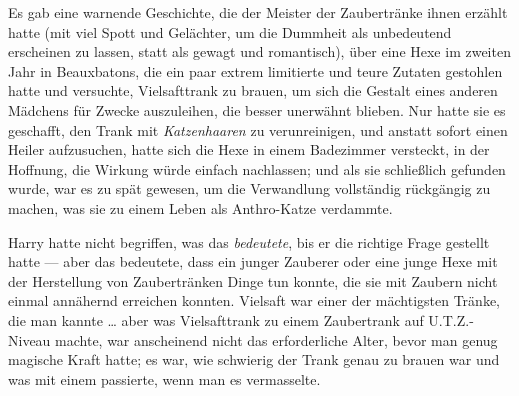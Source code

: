 Es gab eine warnende Geschichte, die der Meister der Zaubertränke ihnen erzählt hatte (mit viel Spott und Gelächter, um die Dummheit als unbedeutend erscheinen zu lassen, statt als gewagt und romantisch), über eine Hexe im zweiten Jahr in Beauxbatons, die ein paar extrem limitierte und teure Zutaten gestohlen hatte und versuchte, Vielsafttrank zu brauen, um sich die Gestalt eines anderen Mädchens für Zwecke auszuleihen, die besser unerwähnt blieben. Nur hatte sie es geschafft, den Trank mit \emph{Katzenhaaren} zu verunreinigen, und anstatt sofort einen Heiler aufzusuchen, hatte sich die Hexe in einem Badezimmer versteckt, in der Hoffnung, die Wirkung würde einfach nachlassen; und als sie schließlich gefunden wurde, war es zu spät gewesen, um die Verwandlung vollständig rückgängig zu machen, was sie zu einem Leben als Anthro-Katze verdammte.

Harry hatte nicht begriffen, was das \emph{bedeutete}, bis er die richtige Frage gestellt hatte — aber das bedeutete, dass ein junger Zauberer oder eine junge Hexe mit der Herstellung von Zaubertränken Dinge tun konnte, die sie mit Zaubern nicht einmal annähernd erreichen konnten. Vielsaft war einer der mächtigsten Tränke, die man kannte … aber was Vielsafttrank zu einem Zaubertrank auf U.T.Z.-Niveau machte, war anscheinend nicht das erforderliche Alter, bevor man genug magische Kraft hatte; es war, wie schwierig der Trank genau zu brauen war und was mit einem passierte, wenn man es vermasselte.

